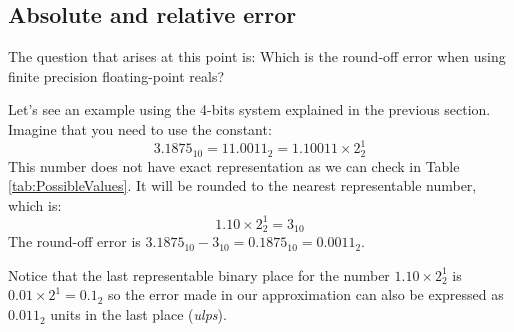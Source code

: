 


        \subsection{Absolute and relative error}


The question that arises at this point is: Which is the round-off error when using finite precision floating-point reals?

Let's see an example using the 4-bits system explained in the previous section. Imagine that you need to use the constant: 
$$
3.1875_{10} = 11.0011_2 = 1.10011\times 2^1_2
$$
This number does not have exact representation as we can check in Table \ref{tab:PossibleValues}. It will be rounded to the nearest representable number, which is: 
$$
1.10\times2^1_2 = 3_{10}
$$
The round-off error is $3.1875_{10} - 3_{10} = 0.1875_{10} = 0.0011_2$.
 
Notice that the last representable binary place for the number $1.10\times2^1_2$ is $0.01\times2^1 = 0.1_2$ 
so the error made in our approximation can also be expressed as $0.011_2$ units in the last place (\textit{ulps}). 





